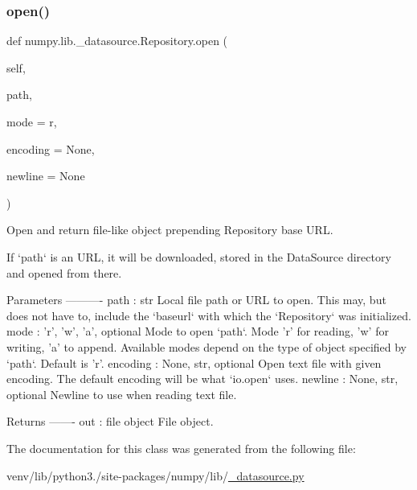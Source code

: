 \subsubsection{\texorpdfstring{open()}{open()}}
{\footnotesize\ttfamily def numpy.\+lib.\+\_\+datasource.\+Repository.\+open (\begin{DoxyParamCaption}\item[{}]{self,  }\item[{}]{path,  }\item[{}]{mode = {\ttfamily \textquotesingle{}r\textquotesingle{}},  }\item[{}]{encoding = {\ttfamily None},  }\item[{}]{newline = {\ttfamily None} }\end{DoxyParamCaption})}

\begin{DoxyVerb}Open and return file-like object prepending Repository base URL.

If `path` is an URL, it will be downloaded, stored in the
DataSource directory and opened from there.

Parameters
----------
path : str
    Local file path or URL to open. This may, but does not have to,
    include the `baseurl` with which the `Repository` was
    initialized.
mode : {'r', 'w', 'a'}, optional
    Mode to open `path`.  Mode 'r' for reading, 'w' for writing,
    'a' to append. Available modes depend on the type of object
    specified by `path`. Default is 'r'.
encoding : {None, str}, optional
    Open text file with given encoding. The default encoding will be
    what `io.open` uses.
newline : {None, str}, optional
    Newline to use when reading text file.

Returns
-------
out : file object
    File object.\end{DoxyVerb}
 

The documentation for this class was generated from the following file\+:\begin{DoxyCompactItemize}
\item 
venv/lib/python3./site-\/packages/numpy/lib/\hyperlink{__datasource_8py}{\+\_\+datasource.\+py}\end{DoxyCompactItemize}
